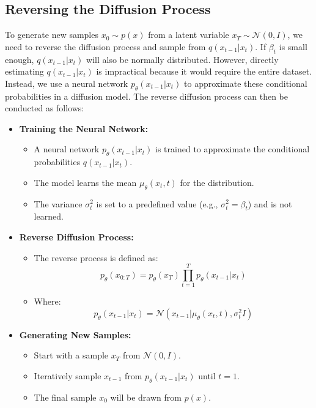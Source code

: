 \documentclass[a4paper]{article}
\begin{document}
\subsection{Reversing the Diffusion Process}

To generate new samples \( x_0 \sim p(x) \) from a latent variable \( x_T \sim \mathcal{N}(0, I) \), we need to reverse the diffusion process and sample from \( q(x_{t-1} | x_t) \). If \( \beta_t \) is small enough, \( q(x_{t-1} | x_t) \) will also be normally distributed. However, directly estimating \( q(x_{t-1} | x_t) \) is impractical because it would require the entire dataset. Instead, we use a neural network \( p_\theta(x_{t-1} | x_t) \) to approximate these conditional probabilities in a diffusion model. The reverse diffusion process can then be conducted as follows:

\begin{itemize}
    \item \textbf{Training the Neural Network:}
    \begin{itemize}
        \item A neural network \( p_\theta(x_{t-1} | x_t) \) is trained to approximate the conditional probabilities \( q(x_{t-1} | x_t) \).
        \item The model learns the mean \( \mu_\theta(x_t, t) \) for the distribution.
        \item The variance \( \sigma_t^2 \) is set to a predefined value (e.g., \( \sigma_t^2 = \beta_t \)) and is not learned.
    \end{itemize}

    \item \textbf{Reverse Diffusion Process:}
    \begin{itemize}
        \item The reverse process is defined as:
        \[
        p_\theta(x_{0:T}) = p_\theta(x_T) \prod_{t=1}^{T} p_\theta(x_{t-1} | x_t)
        \]
        \item Where:
        \[
        p_\theta(x_{t-1} | x_t) = \mathcal{N}(x_{t-1} | \mu_\theta(x_t, t), \sigma_t^2 I)
        \]
    \end{itemize}
    
    \item \textbf{Generating New Samples:}
    \begin{itemize}
        \item Start with a sample \( x_T \) from \( \mathcal{N}(0, I) \).
        \item Iteratively sample \( x_{t-1} \) from \( p_\theta(x_{t-1} | x_t) \) until \( t = 1 \).
        \item The final sample \( x_0 \) will be drawn from \( p(x) \).
    \end{itemize}
\end{itemize}
\end{document}
